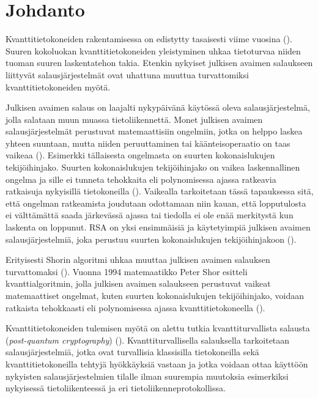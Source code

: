 \chapter{Johdanto\label{intro}}
Kvanttitietokoneiden rakentamisessa on edistytty tasaisesti viime vuosina (\cite{alagic2020status}). Suuren kokoluokan kvanttitietokoneiden yleistyminen uhkaa tietoturvaa niiden tuoman suuren laskentatehon takia. Etenkin nykyiset julkisen avaimen salaukseen liittyvät salausjärjestelmät ovat uhattuna muuttua turvattomiksi kvanttitietokoneiden myötä.

Julkisen avaimen salaus on laajalti nykypäivänä käytössä oleva salausjärjestelmä, jolla salataan muun muassa tietoliikennettä. %
Monet julkisen avaimen salausjärjestelmät perustuvat matemaattisiin ongelmiin, jotka on helppo laskea yhteen suuntaan, mutta niiden peruuttaminen tai käänteisoperaatio on taas vaikeaa (\cite{mavroeidis2018impact}). Esimerkki tällaisesta ongelmasta on suurten kokonaislukujen tekijöihinjako. Suurten kokonaislukujen tekijöihinjako on vaikea laskennallinen ongelma ja sille ei tunneta tehokkaita eli polynomisessa ajassa ratkeavia ratkaisuja nykyisillä tietokoneilla (\cite{doi:10.1137/S0036144598347011}). Vaikealla tarkoitetaan tässä tapauksessa sitä, että ongelman ratkeamista joudutaan odottamaan niin kauan, että lopputulosta ei välttämättä saada järkevässä ajassa tai tiedolla ei ole enää merkitystä kun laskenta on loppunut. %
RSA on yksi ensimmäisiä ja käytetyimpiä julkisen avaimen salausjärjestelmiä, joka perustuu suurten kokonaislukujen tekijöihinjakoon (\cite{montgomery1994survey}).

Erityisesti Shorin algoritmi uhkaa muuttaa julkisen avaimen salauksen turvattomaksi (\cite{mavroeidis2018impact}). Vuonna 1994 matemaatikko Peter Shor esitteli kvanttialgoritmin, jolla julkisen avaimen salaukseen perustuvat vaikeat matemaattiset ongelmat, kuten suurten kokonaislukujen tekijöihinjako, voidaan ratkaista tehokkaasti eli polynomisessa ajassa kvanttitietokoneella (\cite{doi:10.1137/S0036144598347011}).

Kvanttitietokoneiden tulemisen myötä on alettu tutkia kvanttiturvallista salausta (\emph{post-quantum cryptography}) (\cite{alagic2020status}). Kvanttiturvallisella salauksella tarkoitetaan salausjärjestelmiä, jotka ovat turvallisia klassisilla tietokoneilla sekä kvanttitietokoneilla tehtyjä hyökkäyksiä vastaan ja jotka voidaan ottaa käyttöön nykyisten salausjärjestelmien tilalle ilman suurempia muutoksia esimerkiksi nykyisessä tietoliikenteessä ja eri tietoliikenneprotokollissa.

